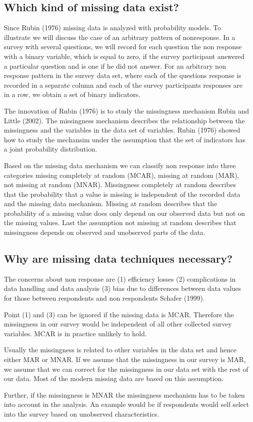 \subsection{Which kind of missing data exist?} 
Since Rubin (1976) missing data is analyzed with probability models. 
To illustrate we will discuss the case of an arbitrary pattern of nonresponse.
In a survey with several questions, we will record for each question the non response with a binary variable, which is equal to zero, if the survey participant answered a particular question and is one if he did not answer. 
For an arbitrary non response pattern in the survey data set, where each of the questions response is recorded in a separate column and each of the survey participants responses are in a row, we obtain a set of binary indicators. \par 
The innovation of Rubin (1976) is to study the missingness mechanism Rubin and Little (2002). The missingness mechanism describes the relationship between the missingness and the variables in the data set of variables. Rubin (1976) showed how to study the mechansim under the assumption that the set of indicators has a joint probability distribution. \par
Based on the missing data mechanism we can classify non response into three categories missing completely at random (MCAR), missing at random (MAR), not missing at random (MNAR).  Missingness completely at random describes that the probability that a value is missing is independent of the recorded data and the missing data mechanism. 
Missing at random describes that the probability of a missing value does only depend on our observed data but not on the missing values. 
Last the assumption not missing at random describes that missingness depends on observed and unobserved parts of the data. \par

\subsection{Why are missing data techniques necessary?}

The concerns about non response are (1) efficiency losses (2) complications in data handling and data analysis (3) bias due to differences between data values for those between respondents and non respondents  Schafer (1999). \par 
Point (1) and (3)  can be ignored if the missing data is MCAR. 
Therefore the missingness in our survey would be independent of all other collected survey variables. MCAR is in practice unlikely to hold. \par 
Usually the missingness is related to other variables in the data set and hence either MAR or MNAR. 
If we assume that the missingness in our survey is  MAR, we assume that we can correct for the missingness in our data set with the rest of our data.  Most of the modern missing data are based on this assumption. \par
Further, if the missingness is MNAR the missingness mechanism has to be taken into account in the analysis. An example would be if respondents would self select into the survey based on unobserved characteristics. 

